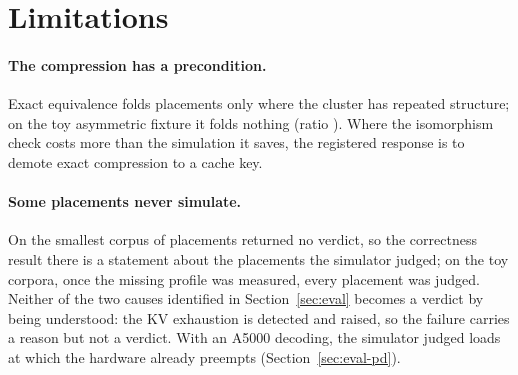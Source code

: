 \section{Limitations}
\label{sec:limits}

\paragraph{The compression has a precondition.}
Exact equivalence folds placements only where the cluster has repeated
structure; on the toy asymmetric fixture it folds nothing (ratio
\egoneRatioAsym). Where the isomorphism check costs more than the simulation it
saves, the registered response is to demote exact compression to a cache key.

\paragraph{Some placements never simulate.}
On the smallest corpus \egthreeUnjudgedLab{} of \egthreeEmbeddingsLab{}
placements returned no verdict, so the correctness result there is a
statement about the placements the simulator judged; on the toy corpora, once
the missing profile was measured, every placement was judged. Neither of the two causes
identified in Section~\ref{sec:eval} becomes a
verdict by being understood: the KV exhaustion is detected and raised, so the
failure carries a reason but not a verdict. With an A5000 decoding, the
simulator judged loads at which the hardware already preempts
(Section~\ref{sec:eval-pd}).

